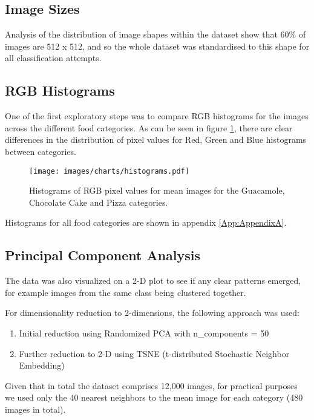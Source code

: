 \documentclass[10pt,a4paper]{article}
\begin{document}
\subsection*{Image Sizes}

Analysis of the distribution of image shapes within the dataset show that 60\% of images are 512 x 512, and so the whole dataset was standardised to this shape for all classification attempts.

\subsection*{RGB Histograms}

One of the first exploratory steps was to compare RGB histograms for the images across the different food categories. As can be seen in figure \ref{fig:hist-1}, there are clear differences in the distribution of pixel values for Red, Green and Blue histograms between categories.

\begin{figure}[h]
\begin{framed}
  \caption{Histograms of RGB pixel values for mean images for the Guacamole, Chocolate Cake and Pizza categories.}
  \texttt{[image: images/charts/histograms.pdf]}
  \label{fig:hist-1}
\end{framed}
\end{figure}

Histograms for all food categories are shown in appendix \ref{App:AppendixA}.

\subsection*{Principal Component Analysis}

The data was also visualized on a 2-D plot to see if any clear patterns emerged, for example images from the same class being clustered together.

For dimensionality reduction to 2-dimensions, the following approach was used:
\begin{enumerate}
\item Initial reduction using Randomized PCA with n\_components = 50
\item Further reduction to 2-D using TSNE (t-distributed Stochastic Neighbor Embedding)
\end{enumerate}

Given that in total the dataset comprises 12,000 images, for practical purposes we used only the 40 nearest neighbors to the mean image for each category (480 images in total).
\end{document}
